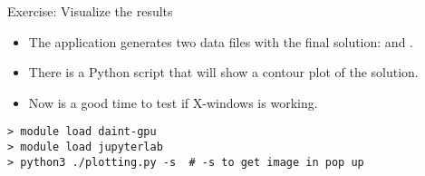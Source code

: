 \documentclass[aspectratio=43]{beamer}
\begin{document}
\begin{frame}[fragile]{Exercise: Visualize the results}
    \begin{itemize}
        \item The application generates two data files with the final solution:  and .
        \item There is a Python script that will show a contour plot  of the solution.
        \item Now is a good time to test if X-windows is working.
    \end{itemize}
\begin{lstlisting}[style=terminal]
> module load daint-gpu
> module load jupyterlab
> python3 ./plotting.py -s  # -s to get image in pop up
\end{lstlisting}
\end{frame}

\end{document}
